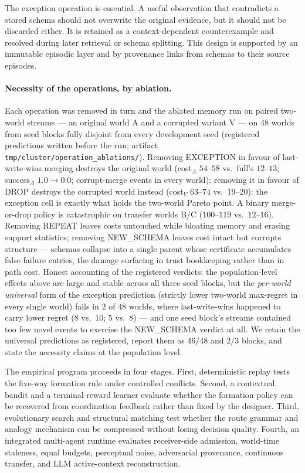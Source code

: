 \documentclass{article}
\begin{document}
The exception operation is essential. A useful observation that
contradicts a stored schema should not overwrite the original evidence,
but it should not be discarded either. It is retained as a
context-dependent counterexample and resolved during later retrieval
or schema splitting. This design is supported by an immutable
episodic layer and by provenance links from schemas to their source
episodes.

\paragraph{Necessity of the operations, by ablation.} Each operation
was removed in turn and the ablated memory run on paired two-world
streams --- an original world A and a corrupted variant V --- on $48$
worlds from seed blocks fully disjoint from every development seed
(registered predictions written before the run; artifact
\texttt{tmp/cluster/operation\_ablations/}). Removing EXCEPTION in
favour of last-write-wins merging destroys the original world
(cost$_A$ $54$--$58$ vs.\ full's $12$--$13$; success$_A$
$1.0 \to 0.0$; corrupt-merge events in every world); removing it in
favour of DROP destroys the corrupted world instead (cost$_V$
$63$--$74$ vs.\ $19$--$20$): the exception cell is exactly what holds
the two-world Pareto point. A binary merge-or-drop policy is
catastrophic on transfer worlds B/C ($100$--$119$ vs.\ $12$--$16$).
Removing REPEAT leaves costs untouched while bloating memory and
erasing support statistics; removing NEW\_SCHEMA leaves cost intact
but corrupts structure --- schemas collapse into a single parent whose
certificate accumulates false failure entries, the damage surfacing in
trust bookkeeping rather than in path cost. Honest accounting of the
registered verdicts: the population-level effects above are large and
stable across all three seed blocks, but the \emph{per-world
universal} form of the exception prediction (strictly lower two-world
max-regret in every single world) fails in $2$ of $48$ worlds, where
last-write-wins happened to carry lower regret ($8$ vs.\ $10$; $5$
vs.\ $8$) --- and one seed block's streams contained too few novel
events to exercise the NEW\_SCHEMA verdict at all. We retain the
universal predictions as registered, report them as $46/48$ and
$2/3$ blocks, and state the necessity claims at the population level.

The empirical program proceeds in four stages. First, deterministic
replay tests the five-way formation rule under controlled conflicts.
Second, a contextual bandit and a terminal-reward learner evaluate
whether the formation policy can be recovered from coordination
feedback rather than fixed by the designer. Third, evolutionary search
and structural matching test whether the route grammar and analogy
mechanism can be compressed without losing decision quality. Fourth,
an integrated multi-agent runtime evaluates receiver-side admission,
world-time staleness, equal budgets, perceptual noise, adversarial
provenance, continuous transfer, and LLM active-context
reconstruction.
\end{document}

